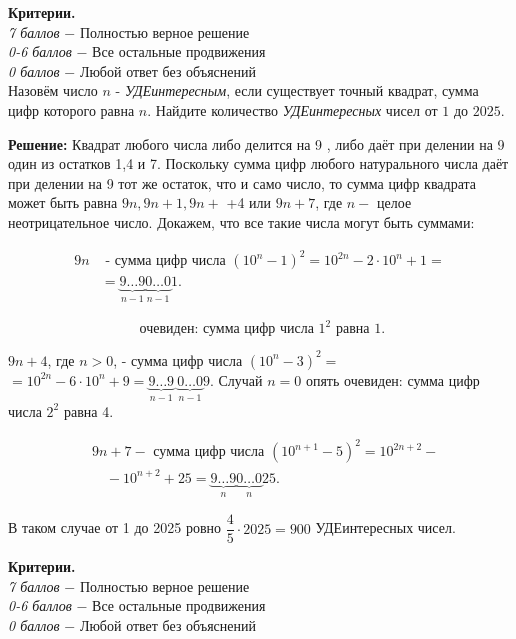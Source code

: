 \textbf{Критерии.} \\
\textit{7 баллов} $-$ Полностью верное решение\\
\textit{0-6 баллов} $-$ Все остальные продвижения\\
\textit{0 баллов} $-$ Любой ответ без объяснений\\

Назовём число $n$ - \textit{УДЕинтересным}, если существует точный квадрат, сумма цифр которого равна $n$. Найдите количество \textit{УДЕинтересных} чисел от $1$ до $2025$.

\textbf{Решение:} Квадрат любого числа либо делится на 9 , либо даёт при делении на 9 один из остатков 1,4 и 7. Поскольку сумма цифр любого натурального числа даёт при делении на 9 тот же остаток, что и само число, то сумма цифр квадрата может быть равна $9 n, 9 n+1,9 n+$ +4 или $9 n+7$, где $n-$ целое неотрицательное число. Докажем, что все такие числа могут быть суммами:

$$
\begin{aligned}
9 n & \text { - сумма цифр числа }\left(10^n-1\right)^2=10^{2 n}-2 \cdot 10^n+1= \\
& =\underbrace{9 \ldots 9}_{n-1} \underbrace{0 \ldots 0}_{n-1} 1 .
\end{aligned}
$$


$$
\text { очевиден: сумма цифр числа } 1^2 \text { равна } 1 .
$$

$9 n+4$, где $n>0$, - сумма цифр числа $\left(10^n-3\right)^2=$ $=10^{2 n}-6 \cdot 10^n+9=\underbrace{9 \ldots 9}_{n-1}\ \underbrace{0 \ldots 0}_{n-1} 9$. Случай $n=0$ опять очевиден: сумма цифр числа $2^2$ равна 4.

$$
\begin{aligned}
& 9 n+7-\text { сумма цифр числа }\left(10^{n+1}-5\right)^2=10^{2 n+2}- \\
& \quad-10^{n+2}+25=\underbrace{9 \ldots 9}_n \underbrace{0 \ldots 0}_n 25 .
\end{aligned}
$$

В таком случае от 1 до 2025 ровно $\dfrac{4}{5}\cdot2025 = 900$ УДЕинтересных чисел.

\textbf{Критерии.} \\
\textit{7 баллов} $-$ Полностью верное решение\\
\textit{0-6 баллов} $-$ Все остальные продвижения\\
\textit{0 баллов} $-$ Любой ответ без объяснений\\